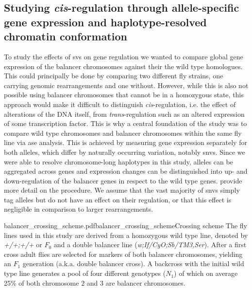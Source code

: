 \subsection{Studying \texorpdfstring{\textit{cis}}{cis}-regulation through
    allele-specific gene expression and haplotype-resolved chromatin conformation}
\label{sec:balancer_ase_motivation}

To study the effects of \acp{sv} on gene regulation we wanted to compare global
gene expression of the balancer chromosomes against their the wild type
homologues. This could principally be done by comparing two different fly
strains, one carrying genomic rearrangements and one without. However, while
this is also not possible using balancer chromosomes that cannot be
in a homozygous state, this approach would make it difficult to distinguish
\textit{cis}-regulation, i.e. the effect of alterations of the DNA itself, from
\textit{trans}-regulation such as an altered expression of some transcription
factor. This is why a central foundation of the study was to compare wild
type chromosomes and balancer chromosomes within the same fly line via \acf{ase} analysis.
This is achieved by measuring gene expression separately for both alleles, which
differ by naturally occurring variation, notably \acp{snv}.
Since we were able to resolve chromosome-long haplotypes in this study, alleles can be
aggregated across genes and expression changes can be distinguished into up- and
down-regulation of the balancer genes in respect to the wild type genes.
 provide more detail on the procedure.
We assume that the vast majority of \acp{snv} simply tag alleles but do not have
an effect on their regulation, or that this effect is negligible in comparison
to larger rearrangements.

    {balancer_crossing_scheme.pdf}{balancer_crossing_scheme}{Crossing scheme}{
        The fly lines used in this study are derived from a homozygous wild type
        line, denoted by \textit{+/+;+/+} or $F_0$ and a double balancer line
        (\textit{w;If/CyO;Sb/TM3,Ser}). After a first cross adult flies are
        selected for markers of both balancer chromosomes, yielding an $F_1$
        generation (a.k.a. double balancer cross). A backcross with the initial
        wild type line generates a pool of four different genotypes ($N_1$)
        of which on average 25\% of both chromosome 2 and 3 are balancer
        chromosomes.}

